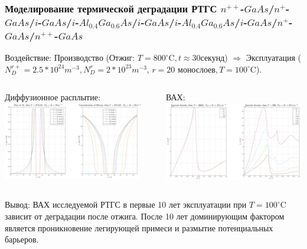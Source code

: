 \documentclass[10pt,pdf,hyperref={unicode},aspectratio={169}]{beamer}
\begin{document}
\begin{frame}
\frametitle{Моделирование термической деградации РТГС $n^{++}$-$GaAs$/$n^{+}$-$GaAs$/$i$-$GaAs$/$i$-$Al_{0.4}Ga_{0.6}As$/$i$-$GaAs$/$i$-$Al_{0.4}Ga_{0.6}As$/$i$-$GaAs$/$n^{+}$-$GaAs$/$n^{++}$-$GaAs$}
	{\color{blue}Воздействие:} {\color{red}Производство} (Отжиг: $T = 800^\circ\text{C}, t \approx 30\text{секунд}$)  $\Rightarrow$ {\color{blue}Эксплуатация} ($N_{D}^{r+} = 2.5*10^{24}m^{-3}, N_{D}^{r} = 2*10^{23}m^{-3},\,r=20\text{ монослоев},T = 100^\circ\text{C}$).
	\begin{columns}
		{\color{red} Диффузионное расплытие:}\\
	   	\includegraphics[width=.99\linewidth,center]{assets/DegrC}\\
		\rule[0mm]{0.2ex}{40mm}
		{\color{red} ВАХ:}\\
	   	\includegraphics[width=.99\linewidth,center]{assets/DegrJ}\\
	\end{columns}
	{\large\color{blue}Вывод:} ВАХ исследуемой РТГС в первые 10 лет эксплуатации при $T = 100^\circ\text{C}$ зависит от деградации после отжига. После 10 лет доминирующим фактором является проникновение легирующей примеси и размытие потенциальных барьеров.
\end{frame}
\end{document}

